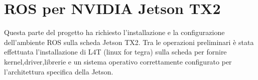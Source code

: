 \documentclass[a4paper]{article}
\begin{document}
\begin{frontespizio}

\end{frontespizio}
\tableofcontents
\newpage

    

\section{ROS per NVIDIA Jetson TX2}
Questa parte del progetto ha richiesto l'installazione e la configurazione dell'ambiente ROS sulla scheda Jetson TX2.
Tra le operazioni preliminari è stata effettuata l'installazione di L4T (linux for tegra) sulla scheda per fornire kernel,driver,librerie e un sistema operativo
correttamente configurato per l'architettura specifica della Jetson.
\end{document}
